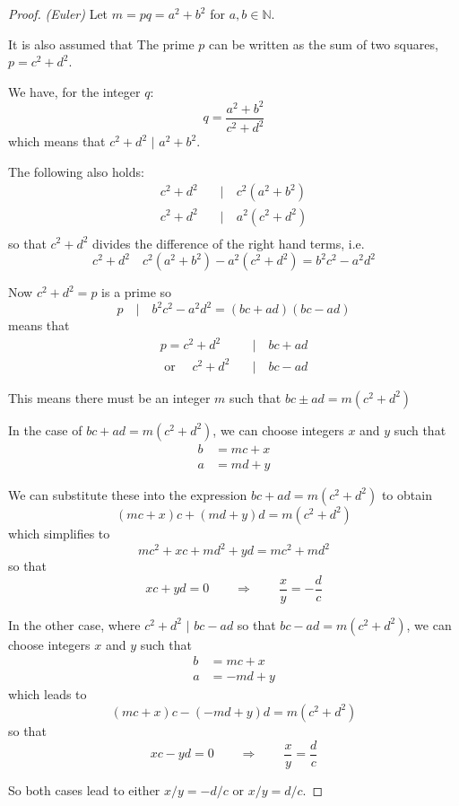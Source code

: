 \documentclass[11pt]{amsart}
\begin{document}
\begin{proof} \emph{(Euler)}
Let $m = pq = a^2 + b^2$ for $a,b \in \mathbb{N}$.

It is also assumed that The prime $p$ can be written as the sum of two squares, $p = c^2 + d^2$.

We have, for the integer $q$:
$$
q = \frac{a^2 + b^2}{c^2 + d^2}
$$
which means that $c^2 + d^2$ $|$ $a^2 + b^2$.

The following also holds:
$$
\begin{aligned}
c^2 + d^2 \quad &| \quad c^2 ( a^2 + b^2) \\
 c^2 + d^2 \quad &| \quad a^2 ( c^2 + d^2) \\
\end{aligned}
$$
so that $c^2 + d^2$ divides the difference of the right hand terms, i.e. 
$$
c^2 + d^2 \quad
c^2 ( a^2 + b^2) - a^2 ( c^2 + d^2) 
= b^2 c^2 - a^2 d^2
$$

Now $c^2 + d^2 = p$ is a prime so 
$$
p \quad | \quad b^2 c^2 - a^2 d^2 = (bc + ad)  (bc - ad)
$$
means that
$$
\begin{aligned}
p = c^2 + d^2 \quad &| \quad bc + ad  \\
\text{ or } \quad c^2 + d^2 \quad &| \quad bc - ad
\end{aligned}
$$

This means there must be an integer $m$ such that $bc \pm ad = m (c^2 + d^2)$

In the case of $bc + ad = m (c^2 + d^2)$, we can choose integers $x$ and $y$ such that
$$
\begin{aligned}
b &= mc + x \\
a &=  md + y
\end{aligned}
$$

We can substitute these into the expression $bc + ad = m (c^2 + d^2)$ to obtain
$$
(mc + x)c + (md + y)d = m (c^2 + d^2)
$$
which simplifies to
$$
mc^2 + xc + md^2 + yd = m c^2 + m d^2
$$
so that 
$$
xc + yd = 0 \qquad \Rightarrow \qquad
\frac{x}{y} = - \frac{d}{c}
$$

In the other case, where $c^2 + d^2 $ $|$ $bc-ad$ so that  $bc - ad = m (c^2 + d^2)$, we can choose integers $x$ and $y$ such that
$$
\begin{aligned}
b &= mc + x \\
a &=  - md + y
\end{aligned}
$$
which leads to 
$$
(mc + x)c - (- md + y)d = m (c^2 + d^2)
$$
so that 
$$
xc - yd = 0
\qquad \Rightarrow \qquad
\frac{x}{y} = \frac{d}{c}
$$

So both cases lead to either $x/y = -d/c$ or $x/y = d/c$.


\end{proof}
\end{document}
